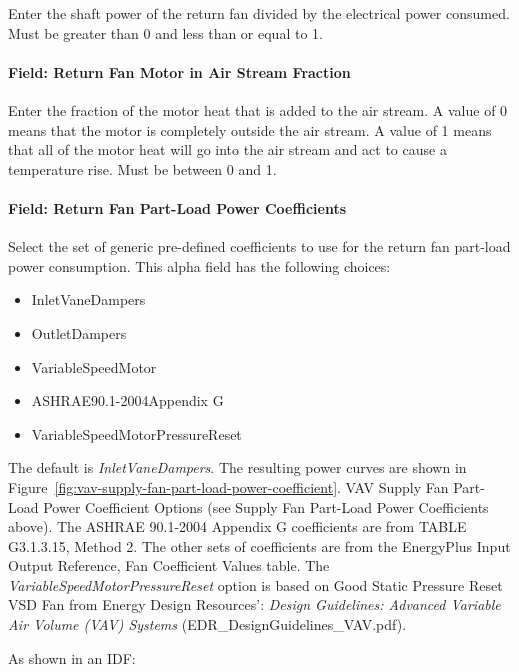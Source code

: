 Enter the shaft power of the return fan divided by the electrical power consumed. Must be greater than 0 and less than or equal to 1.

\paragraph{Field: Return Fan Motor in Air Stream Fraction}\label{field-return-fan-motor-in-air-stream-fraction-4}

Enter the fraction of the motor heat that is added to the air stream. A value of 0 means that the motor is completely outside the air stream. A value of 1 means that all of the motor heat will go into the air stream and act to cause a temperature rise. Must be between 0 and 1.

\paragraph{Field: Return Fan Part-Load Power Coefficients}\label{field-return-fan-part-load-power-coefficients-1}

Select the set of generic pre-defined coefficients to use for the return fan part-load power consumption. This alpha field has the following choices:

\begin{itemize}
\item
  InletVaneDampers
\item
  OutletDampers
\item
  VariableSpeedMotor
\item
  ASHRAE90.1-2004Appendix G
\item
  VariableSpeedMotorPressureReset
\end{itemize}

The default is \emph{InletVaneDampers}. The resulting power curves are shown in Figure~\ref{fig:vav-supply-fan-part-load-power-coefficient}. VAV Supply Fan Part-Load Power Coefficient Options (see Supply Fan Part-Load Power Coefficients above). The ASHRAE 90.1-2004 Appendix G coefficients are from TABLE G3.1.3.15, Method 2. The other sets of coefficients are from the EnergyPlus Input Output Reference, Fan Coefficient Values table. The \emph{VariableSpeedMotorPressureReset} option is based on Good Static Pressure Reset VSD Fan from Energy Design Resources': \emph{Design Guidelines: Advanced Variable Air Volume (VAV) Systems} (EDR\_DesignGuidelines\_VAV.pdf).

As shown in an IDF:


